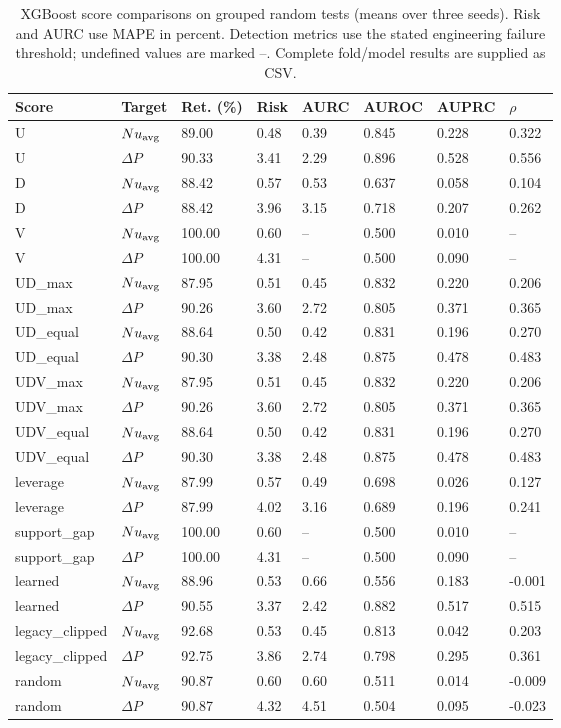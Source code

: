 \begin{table}[htbp]\centering\scriptsize\caption{XGBoost score comparisons on grouped random tests (means over three seeds). Risk and AURC use MAPE in percent. Detection metrics use the stated engineering failure threshold; undefined values are marked --. Complete fold/model results are supplied as CSV.}\label{tab:ablation}
\begin{tabular}{llllllll}\toprule
Score & Target & Ret. (\%) & Risk & AURC & AUROC & AUPRC & $\rho$\\\midrule
U & $Nu_{\rm avg}$ & 89.00 & 0.48 & 0.39 & 0.845 & 0.228 & 0.322\\
U & $\Delta P$ & 90.33 & 3.41 & 2.29 & 0.896 & 0.528 & 0.556\\
D & $Nu_{\rm avg}$ & 88.42 & 0.57 & 0.53 & 0.637 & 0.058 & 0.104\\
D & $\Delta P$ & 88.42 & 3.96 & 3.15 & 0.718 & 0.207 & 0.262\\
V & $Nu_{\rm avg}$ & 100.00 & 0.60 & -- & 0.500 & 0.010 & --\\
V & $\Delta P$ & 100.00 & 4.31 & -- & 0.500 & 0.090 & --\\
UD\_max & $Nu_{\rm avg}$ & 87.95 & 0.51 & 0.45 & 0.832 & 0.220 & 0.206\\
UD\_max & $\Delta P$ & 90.26 & 3.60 & 2.72 & 0.805 & 0.371 & 0.365\\
UD\_equal & $Nu_{\rm avg}$ & 88.64 & 0.50 & 0.42 & 0.831 & 0.196 & 0.270\\
UD\_equal & $\Delta P$ & 90.30 & 3.38 & 2.48 & 0.875 & 0.478 & 0.483\\
UDV\_max & $Nu_{\rm avg}$ & 87.95 & 0.51 & 0.45 & 0.832 & 0.220 & 0.206\\
UDV\_max & $\Delta P$ & 90.26 & 3.60 & 2.72 & 0.805 & 0.371 & 0.365\\
UDV\_equal & $Nu_{\rm avg}$ & 88.64 & 0.50 & 0.42 & 0.831 & 0.196 & 0.270\\
UDV\_equal & $\Delta P$ & 90.30 & 3.38 & 2.48 & 0.875 & 0.478 & 0.483\\
leverage & $Nu_{\rm avg}$ & 87.99 & 0.57 & 0.49 & 0.698 & 0.026 & 0.127\\
leverage & $\Delta P$ & 87.99 & 4.02 & 3.16 & 0.689 & 0.196 & 0.241\\
support\_gap & $Nu_{\rm avg}$ & 100.00 & 0.60 & -- & 0.500 & 0.010 & --\\
support\_gap & $\Delta P$ & 100.00 & 4.31 & -- & 0.500 & 0.090 & --\\
learned & $Nu_{\rm avg}$ & 88.96 & 0.53 & 0.66 & 0.556 & 0.183 & -0.001\\
learned & $\Delta P$ & 90.55 & 3.37 & 2.42 & 0.882 & 0.517 & 0.515\\
legacy\_clipped & $Nu_{\rm avg}$ & 92.68 & 0.53 & 0.45 & 0.813 & 0.042 & 0.203\\
legacy\_clipped & $\Delta P$ & 92.75 & 3.86 & 2.74 & 0.798 & 0.295 & 0.361\\
random & $Nu_{\rm avg}$ & 90.87 & 0.60 & 0.60 & 0.511 & 0.014 & -0.009\\
random & $\Delta P$ & 90.87 & 4.32 & 4.51 & 0.504 & 0.095 & -0.023\\
\bottomrule\end{tabular}\end{table}
